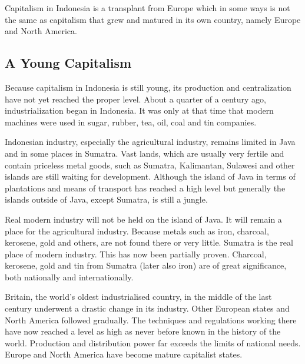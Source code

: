 Capitalism in Indonesia is a transplant from Europe which in 
some ways is not the same as capitalism that grew and matured in its own country, namely Europe and North America.\vskip 0.2in

\subsection{A Young Capitalism}

Because capitalism in Indonesia is still young, its production and centralization 
have not yet reached the proper level. About a quarter of a century ago, industrialization 
began in Indonesia. It was only at that time that modern machines were used in sugar, rubber, tea, oil, coal and tin companies.\vskip 0.2in

Indonesian industry, especially the agricultural industry, remains limited 
in Java and in some places in Sumatra. Vast lands, which are usually very 
fertile and contain priceless metal goods, such as Sumatra, Kalimantan, 
Sulawesi and other islands are still waiting for development. Although 
the island of Java in terms of plantations and means of transport has 
reached a high level but generally the islands outside of Java, except Sumatra, is still a jungle.\vskip 0.2in

Real modern industry will not be held on the island of Java. It will remain 
a place for the agricultural industry. Because metals such as iron, charcoal, 
kerosene, gold and others, are not found there or very little. Sumatra is 
the real place of modern industry. This has now been partially proven. Charcoal, 
kerosene, gold and tin from Sumatra (later also iron) are of great significance, both nationally and internationally.\vskip 0.2in

Britain, the world's oldest industrialised country, in the middle of the last 
century underwent a drastic change in its industry. Other European states and 
North America followed gradually. The techniques and regulations working there 
have now reached a level as high as never before known in the history of the world. 
Production and distribution power far exceeds the limits of national needs. Europe 
and North America have become mature capitalist states.\vskip 0.2in

